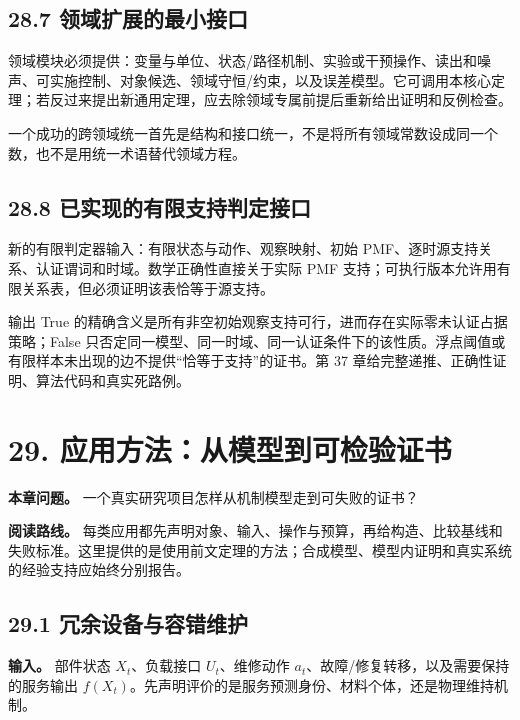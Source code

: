 \documentclass[
  11pt,
  oneside]{book}
\begin{document}
\section{28.7 领域扩展的最小接口}\label{ux9886ux57dfux6269ux5c55ux7684ux6700ux5c0fux63a5ux53e3}

领域模块必须提供：变量与单位、状态/路径机制、实验或干预操作、读出和噪声、可实施控制、对象候选、领域守恒/约束，以及误差模型。它可调用本核心定理；若反过来提出新通用定理，应去除领域专属前提后重新给出证明和反例检查。

一个成功的跨领域统一首先是结构和接口统一，不是将所有领域常数设成同一个数，也不是用统一术语替代领域方程。

\section{28.8 已实现的有限支持判定接口}\label{ux5df2ux5b9eux73b0ux7684ux6709ux9650ux652fux6301ux5224ux5b9aux63a5ux53e3}

新的有限判定器输入：有限状态与动作、观察映射、初始 PMF、逐时源支持关系、认证谓词和时域。数学正确性直接关于实际 PMF 支持；可执行版本允许用有限关系表，但必须证明该表恰等于源支持。

输出 True 的精确含义是所有非空初始观察支持可行，进而存在实际零未认证占据策略；False 只否定同一模型、同一时域、同一认证条件下的该性质。浮点阈值或有限样本未出现的边不提供``恰等于支持''的证书。第 37 章给完整递推、正确性证明、算法代码和真实死路例。

\chapter{29. 应用方法：从模型到可检验证书}\label{ch-29}

\textbf{本章问题。} 一个真实研究项目怎样从机制模型走到可失败的证书？

\textbf{阅读路线。} 每类应用都先声明对象、输入、操作与预算，再给构造、比较基线和失败标准。这里提供的是使用前文定理的方法；合成模型、模型内证明和真实系统的经验支持应始终分别报告。

\section{29.1 冗余设备与容错维护}\label{ux5197ux4f59ux8bbeux5907ux4e0eux5bb9ux9519ux7ef4ux62a4}

\textbf{输入。} 部件状态 \(X_t\)、负载接口 \(U_t\)、维修动作 \(a_t\)、故障/修复转移，以及需要保持的服务输出 \(f(X_t)\)。先声明评价的是服务预测身份、材料个体，还是物理维持机制。
\end{document}
